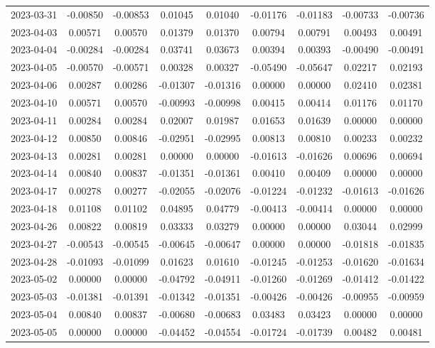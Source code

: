 {\begin{footnotesize}
\begin{longtable}{lcccccccc}
2023-03-31 & -0.00850 & -0.00853 & 0.01045 & 0.01040 & -0.01176 & -0.01183 & -0.00733 & -0.00736 \\
2023-04-03 & 0.00571 & 0.00570 & 0.01379 & 0.01370 & 0.00794 & 0.00791 & 0.00493 & 0.00491 \\
2023-04-04 & -0.00284 & -0.00284 & 0.03741 & 0.03673 & 0.00394 & 0.00393 & -0.00490 & -0.00491 \\
2023-04-05 & -0.00570 & -0.00571 & 0.00328 & 0.00327 & -0.05490 & -0.05647 & 0.02217 & 0.02193 \\
2023-04-06 & 0.00287 & 0.00286 & -0.01307 & -0.01316 & 0.00000 & 0.00000 & 0.02410 & 0.02381 \\
2023-04-10 & 0.00571 & 0.00570 & -0.00993 & -0.00998 & 0.00415 & 0.00414 & 0.01176 & 0.01170 \\
2023-04-11 & 0.00284 & 0.00284 & 0.02007 & 0.01987 & 0.01653 & 0.01639 & 0.00000 & 0.00000 \\
2023-04-12 & 0.00850 & 0.00846 & -0.02951 & -0.02995 & 0.00813 & 0.00810 & 0.00233 & 0.00232 \\
2023-04-13 & 0.00281 & 0.00281 & 0.00000 & 0.00000 & -0.01613 & -0.01626 & 0.00696 & 0.00694 \\
2023-04-14 & 0.00840 & 0.00837 & -0.01351 & -0.01361 & 0.00410 & 0.00409 & 0.00000 & 0.00000 \\
2023-04-17 & 0.00278 & 0.00277 & -0.02055 & -0.02076 & -0.01224 & -0.01232 & -0.01613 & -0.01626 \\
2023-04-18 & 0.01108 & 0.01102 & 0.04895 & 0.04779 & -0.00413 & -0.00414 & 0.00000 & 0.00000 \\
2023-04-26 & 0.00822 & 0.00819 & 0.03333 & 0.03279 & 0.00000 & 0.00000 & 0.03044 & 0.02999 \\
2023-04-27 & -0.00543 & -0.00545 & -0.00645 & -0.00647 & 0.00000 & 0.00000 & -0.01818 & -0.01835 \\
2023-04-28 & -0.01093 & -0.01099 & 0.01623 & 0.01610 & -0.01245 & -0.01253 & -0.01620 & -0.01634 \\
2023-05-02 & 0.00000 & 0.00000 & -0.04792 & -0.04911 & -0.01260 & -0.01269 & -0.01412 & -0.01422 \\
2023-05-03 & -0.01381 & -0.01391 & -0.01342 & -0.01351 & -0.00426 & -0.00426 & -0.00955 & -0.00959 \\
2023-05-04 & 0.00840 & 0.00837 & -0.00680 & -0.00683 & 0.03483 & 0.03423 & 0.00000 & 0.00000 \\
2023-05-05 & 0.00000 & 0.00000 & -0.04452 & -0.04554 & -0.01724 & -0.01739 & 0.00482 & 0.00481 \\

\end{longtable}
\end{footnotesize}}

